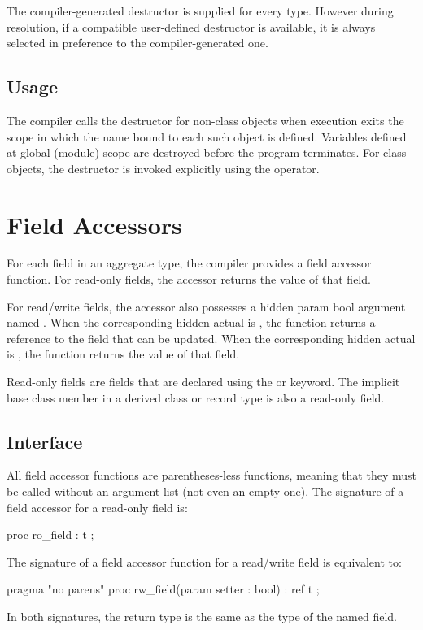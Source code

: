 The compiler-generated destructor is supplied for every type.  However during
resolution, if a compatible user-defined destructor is available, it is always
selected in preference to the compiler-generated one.

\subsection{Usage}

The compiler calls the destructor for non-class objects when execution exits the
scope in which the name bound to each such object is defined.  Variables defined
at global (module) scope are destroyed before the program terminates.  For class
objects, the destructor is invoked explicitly using the  operator.



\section{Field Accessors}

For each field in an aggregate type, the compiler provides a field accessor
function.  For read-only fields, the accessor returns the value of that field.

For read/write fields, the accessor also possesses a hidden param bool argument
named .  When the corresponding hidden actual is , the function
returns a reference to the field that can be updated.  When the corresponding hidden
actual is , the function returns the value of that field.

Read-only fields are fields that are declared using the  or 
keyword.  The implicit base class member  in a derived class or record type is
also a read-only field.

\subsection{Interface}

All field accessor functions are parentheses-less functions, meaning that they must be
called without an argument list (not even an empty one).  The signature of a field
accessor for a read-only field is:
\begin{chapel}
proc ro_field : t ;
\end{chapel}
\noindent
The signature of a field accessor function for a read/write field is equivalent to:
\begin{chapel}
pragma "no parens"
proc rw_field(param setter : bool) : ref t ;
\end{chapel}
\noindent
In both signatures, the return type  is the same as the type of the named field.

